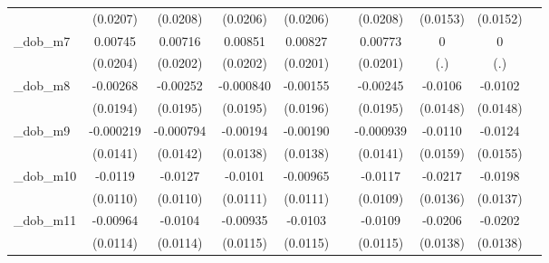 \begin{table}[htbp]
\begin{tabular}{l*{9}{c}}
            &    (0.0207)         &    (0.0208)         &    (0.0206)         &    (0.0206)         &                     &    (0.0208)         &    (0.0153)         &    (0.0152)         &                     \\
[1em]
\_dob\_m7     &     0.00745         &     0.00716         &     0.00851         &     0.00827         &                     &     0.00773         &           0         &           0         &                     \\
            &    (0.0204)         &    (0.0202)         &    (0.0202)         &    (0.0201)         &                     &    (0.0201)         &         (.)         &         (.)         &                     \\
[1em]
\_dob\_m8     &    -0.00268         &    -0.00252         &   -0.000840         &    -0.00155         &                     &    -0.00245         &     -0.0106         &     -0.0102         &                     \\
            &    (0.0194)         &    (0.0195)         &    (0.0195)         &    (0.0196)         &                     &    (0.0195)         &    (0.0148)         &    (0.0148)         &                     \\
[1em]
\_dob\_m9     &   -0.000219         &   -0.000794         &    -0.00194         &    -0.00190         &                     &   -0.000939         &     -0.0110         &     -0.0124         &                     \\
            &    (0.0141)         &    (0.0142)         &    (0.0138)         &    (0.0138)         &                     &    (0.0141)         &    (0.0159)         &    (0.0155)         &                     \\
[1em]
\_dob\_m10    &     -0.0119         &     -0.0127         &     -0.0101         &    -0.00965         &                     &     -0.0117         &     -0.0217         &     -0.0198         &                     \\
            &    (0.0110)         &    (0.0110)         &    (0.0111)         &    (0.0111)         &                     &    (0.0109)         &    (0.0136)         &    (0.0137)         &                     \\
[1em]
\_dob\_m11    &    -0.00964         &     -0.0104         &    -0.00935         &     -0.0103         &                     &     -0.0109         &     -0.0206         &     -0.0202         &                     \\
            &    (0.0114)         &    (0.0114)         &    (0.0115)         &    (0.0115)         &                     &    (0.0115)         &    (0.0138)         &    (0.0138)         &                     \\

\end{tabular}
\end{table}
